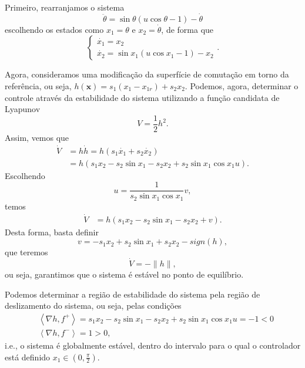 \documentclass[a4paper]{report}
\begin{document}

Primeiro, rearranjamos o sistema \[
\ddot{\theta} = \sin \theta \left( u \cos\theta - 1 \right) - \dot{\theta}
\] escolhendo os estados como $x_1 = \theta$ e $x_2 = \dot{\theta}$, de forma que \[
\begin{cases}
    \dot{x_1} = x_2 \\
    \dot{x_2} = \sin x_1 \left( u \cos x_1 -1 \right) -x_2
\end{cases}
.\] 

Agora, consideramos uma modificação da superfície de comutação em torno da referência, ou seja, $h\left( \bm{x} \right) = s_1(x_1-x_{1r}) +s_2x_2$. Podemos, agora, determinar o controle através da estabilidade do sistema utilizando a função candidata de Lyapunov \[
V = \frac{1}{2}h^2
.\] Assim, vemos que
\begin{align*}
    \dot{V} &= h \dot{h} = h \left( s_1\dot{x_1} + s_2 \dot{x_2} \right) \\
	    &= h(s_1x_2 -s_2\sin x_1 -s_2x_2 + s_2 \sin x_1 \cos x_1 u)
.\end{align*}
Escolhendo \[
u = \frac{1}{s_2 \sin x_1 \cos x_1}v 
,\] temos
\begin{align*}
    \dot{V} &= h(s_1x_2 -s_2\sin x_1 -s_2x_2 + v )
.\end{align*}
Desta forma, basta definir \[
    v = -s_1x_2 +s_2\sin x_1 +s_2x_2 - sign(h)
,\] que teremos \[
\dot{V} = -\|h\|
,\] ou seja, garantimos que o sistema é estável no ponto de equilíbrio.

Podemos determinar a região de estabilidade do sistema pela região de deslizamento do sistema, ou seja, pelas condições
\begin{align*}
    &\left< \nabla h, f^{+} \right> = s_1x_2 -s_2\sin x_1 -s_2x_2 + s_2 \sin x_1 \cos x_1 u = -1 <0 \\
    &\left< \nabla h, f^{-} \right> = 1 >0
,\end{align*}
i.e., o sistema é globalmente estável, dentro do intervalo para o qual o controlador está definido $x_1 \in \left( 0, \frac{\pi}{2} \right) $.
\end{document}
